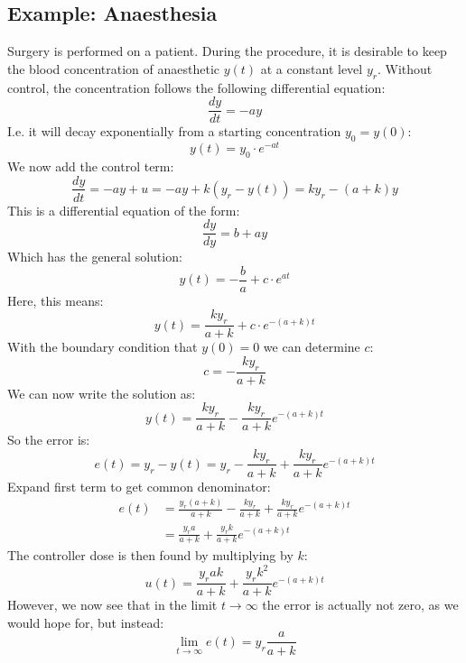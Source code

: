 \documentclass[12pt, a4paper]{article}
\numberwithin{equation}{section}
\begin{document}
\subsection{Example: Anaesthesia}
Surgery is performed on a patient. During the procedure, it is desirable to keep the blood concentration of anaesthetic $y(t)$ at a constant level $y_r$. Without control, the concentration follows the following differential equation:
\begin{equation}
\frac{dy}{dt}=-ay
\end{equation}
I.e. it will decay exponentially from a starting concentration $y_0=y(0)$:
\begin{equation}
y(t)=y_0\cdot e^{-at}
\end{equation}
We now add the control term:
\begin{equation}
\frac{dy}{dt}=-ay+u=-ay+k(y_r-y(t))=ky_r-(a+k)y
\end{equation}
This is a differential equation of the form:
\begin{equation}
\frac{dy}{dy}=b+ay
\end{equation}
Which has the general solution:
\begin{equation}
y(t)=-\frac{b}{a}+c\cdot e^{at}
\end{equation}
Here, this means:
\begin{equation}
y(t)=\frac{ky_r}{a+k}+c\cdot e^{-(a+k)t}
\end{equation}
With the boundary condition that $y(0)=0$ we can determine $c$:
\begin{equation}
c=-\frac{ky_r}{a+k}
\end{equation}
We can now write the solution as:
\begin{equation}
y(t)=\frac{ky_r}{a+k}-\frac{ky_r}{a+k}e^{-(a+k)t}
\end{equation}
So the error is:
\begin{equation}
e(t)=y_r-y(t)=y_r-\frac{ky_r}{a+k}+\frac{ky_r}{a+k}e^{-(a+k)t}
\end{equation}
Expand first term to get common denominator:
\begin{align}
e(t)&=\frac{y_r(a+k)}{a+k}-\frac{ky_r}{a+k}+\frac{ky_r}{a+k}e^{-(a+k)t}\\
&=\frac{y_ra}{a+k}+\frac{y_rk}{a+k}e^{-(a+k)t}\label{anaes_error}
\end{align}
The controller dose is then found by multiplying by $k$:
\begin{equation}
u(t)=\frac{y_rak}{a+k}+\frac{y_rk^2}{a+k}e^{-(a+k)t}
\end{equation}
However, we now see that in the limit $t\rightarrow\infty$ the error is actually not zero, as we would hope for, but instead:
\begin{equation}
\lim_{t\rightarrow\infty}e(t)=y_r\frac{a}{a+k}
\end{equation}
\end{document}
